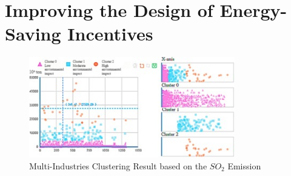 \section{Improving the Design of Energy-Saving Incentives}
\label{sec:improving_the_design_of_energy_saving_incentives}


\begin{figure}
    \centering
    \includegraphics[width=0.8\textwidth]{figures/liu_assessmentOfIndustries/liu_environmentalPerformance.jpg}
    \caption{Multi-Industries Clustering Result based on the $SO_2$ Emission \cite{LIU-BDE}}
    \label{fig:multi_industries_clustering_result_environemental_performance}
\end{figure}

